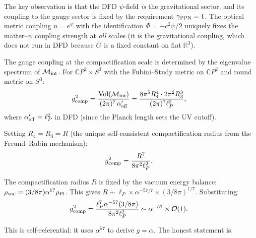 \documentclass[11pt]{article}
\newcommand{\order}[1]{\mathcal{O}(#1)}
\begin{document}
The key observation is that the DFD $\psi$-field \emph{is} the gravitational sector, and its coupling to the gauge sector is fixed by the requirement $\gamma_{\rm PPN} = 1$. The optical metric coupling $n = e^\psi$ with the identification $\Phi = -c^2\psi/2$ uniquely fixes the matter--$\psi$ coupling strength at \emph{all} scales (it is the gravitational coupling, which does not run in DFD because $G$ is a fixed constant on flat $\mathbb{R}^3$).

The gauge coupling at the compactification scale is determined by the eigenvalue spectrum of $\mathcal{M}_{\rm int}$. For $\mathbb{C}P^2 \times S^3$ with the Fubini--Study metric on $\mathbb{C}P^2$ and round metric on $S^3$:
\begin{equation}
g^2_{\rm comp} = \frac{\text{Vol}(\mathcal{M}_{\rm int})}{(2\pi)^7\,\alpha'_{\rm eff}} = \frac{8\pi^5 R_4^4 \cdot 2\pi^2 R_3^3}{(2\pi)^7 \ell_P^2},
\end{equation}
where $\alpha'_{\rm eff} = \ell_P^2$ in DFD (since the Planck length sets the UV cutoff).

Setting $R_4 = R_3 = R$ (the unique self-consistent compactification radius from the Freund--Rubin mechanism):
\begin{equation}
g^2_{\rm comp} = \frac{R^7}{8\pi^2 \ell_P^2}.
\end{equation}

The compactification radius $R$ is fixed by the vacuum energy balance: $\rho_{\rm vac} = (3/8\pi)\alpha^{57}\rho_{\rm Pl}$. This gives $R \sim \ell_P \times \alpha^{-57/7} \times (3/8\pi)^{1/7}$. Substituting:
\begin{equation}
g^2_{\rm comp} = \frac{\ell_P^7 \alpha^{-57}(3/8\pi)}{8\pi^2\ell_P^2} \sim \alpha^{-57}\times\order{1}.
\end{equation}

This is self-referential: it uses $\alpha^{57}$ to derive $g = \alpha$. The honest statement is:
\end{document}
